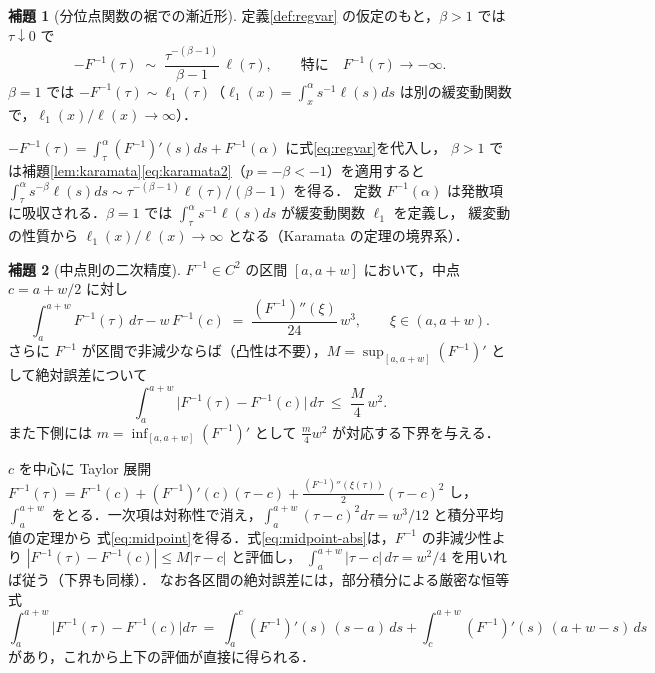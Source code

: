 \documentclass[a4paper,10pt]{jsarticle}
\makeatletter
\theoremstyle{definition}
\newtheorem{lemma}{補題}[section]
\renewenvironment{proof}[1][\proofname]{\par
  \pushQED{\qed}%
  \normalfont \topsep6\p@\@plus6\p@\relax
  \trivlist
  \item[\hskip\labelsep\textbf{#1}]\ignorespaces
}{%
  \popQED\endtrivlist\@endpefalse
}
\renewcommand{\proofname}{証明}
\newcommand{\Finv}{F^{-1}}
\makeatother
\begin{document}
\begin{lemma}[分位点関数の裾での漸近形]
\label{lem:tail}
定義\ref{def:regvar} の仮定のもと，$\beta>1$ では $\tau\downarrow0$ で
\begin{equation}
  -\Finv(\tau)\;\sim\;\frac{\tau^{-(\beta-1)}}{\beta-1}\,\ell(\tau),
  \qquad\text{特に}\quad \Finv(\tau)\to-\infty .
  \label{eq:tail}
\end{equation}
$\beta=1$ では $-\Finv(\tau)\sim\ell_1(\tau)$（$\ell_1(x)=\int_x^\alpha s^{-1}\ell(s)ds$ は別の緩変動関数で，$\ell_1(x)/\ell(x)\to\infty$）．
\end{lemma}
\begin{proof}
$-\Finv(\tau)=\int_\tau^\alpha(\Finv)'(s)ds+\Finv(\alpha)$ に式\eqref{eq:regvar}を代入し，
$\beta>1$ では補題\ref{lem:karamata}\eqref{eq:karamata2}（$p=-\beta<-1$）を適用すると
$\int_\tau^\alpha s^{-\beta}\ell(s)ds\sim\tau^{-(\beta-1)}\ell(\tau)/(\beta-1)$ を得る．
定数 $\Finv(\alpha)$ は発散項に吸収される．$\beta=1$ では $\int_\tau^\alpha s^{-1}\ell(s)ds$ が緩変動関数 $\ell_1$ を定義し，
緩変動の性質から $\ell_1(x)/\ell(x)\to\infty$ となる（Karamata の定理の境界系）．
\end{proof}

\begin{lemma}[中点則の二次精度]
\label{lem:midpoint}
$\Finv\in C^2$ の区間 $[a,a+w]$ において，中点 $c=a+w/2$ に対し
\begin{equation}
  \int_a^{a+w}\Finv(\tau)\,d\tau-w\,\Finv(c)\;=\;\frac{(\Finv)''(\xi)}{24}\,w^3,
  \qquad \xi\in(a,a+w).
  \label{eq:midpoint}
\end{equation}
さらに $\Finv$ が区間で非減少ならば（凸性は不要），$M=\sup_{[a,a+w]}(\Finv)'$ として絶対誤差について
\begin{equation}
  \int_a^{a+w}\bigl|\Finv(\tau)-\Finv(c)\bigr|\,d\tau\;\le\;\frac{M}{4}\,w^2 .
  \label{eq:midpoint-abs}
\end{equation}
また下側には $m=\inf_{[a,a+w]}(\Finv)'$ として $\frac{m}{4}w^2$ が対応する下界を与える．
\end{lemma}
\begin{proof}
$c$ を中心に Taylor 展開 $\Finv(\tau)=\Finv(c)+(\Finv)'(c)(\tau-c)+\frac{(\Finv)''(\xi(\tau))}{2}(\tau-c)^2$ し，
$\int_a^{a+w}$ をとる．一次項は対称性で消え，$\int_a^{a+w}(\tau-c)^2d\tau=w^3/12$ と積分平均値の定理から
式\eqref{eq:midpoint}を得る．式\eqref{eq:midpoint-abs}は，$\Finv$ の非減少性より $|\Finv(\tau)-\Finv(c)|\le M|\tau-c|$ と評価し，
$\int_a^{a+w}|\tau-c|\,d\tau=w^2/4$ を用いれば従う（下界も同様）．
なお各区間の絶対誤差には，部分積分による厳密な恒等式
\begin{equation*}
  \int_a^{a+w}\bigl|\Finv(\tau)-\Finv(c)\bigr|d\tau
  \;=\;\int_a^{c}(\Finv)'(s)\,(s-a)\,ds+\int_c^{a+w}(\Finv)'(s)\,(a+w-s)\,ds
\end{equation*}
があり，これから上下の評価が直接に得られる．
\end{proof}
\end{document}
